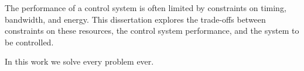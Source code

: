 
The performance of a control system is often limited by constraints on timing, bandwidth, and energy. This dissertation explores the trade-offs between constraints on these resources, the control system performance, and the system to be controlled.

In this work we solve every problem ever.